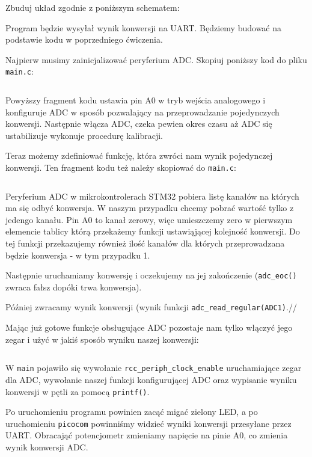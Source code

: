 \documentclass{pdfBooklets}
\begin{document}
Zbuduj układ zgodnie z poniższym schematem:

Program będzie wysyłał wynik konwersji na UART. Będziemy budować na podstawie kodu w poprzedniego ćwiczenia.

Najpierw musimy zainicjalizować peryferium ADC. Skopiuj poniższy kod do pliku \Verb$main.c$:

\inputminted[frame=single,firstline=13,lastline=35]{c}{stm32-examples/03_adc/main.c} %

Powyższy fragment kodu ustawia pin A0 w tryb wejścia analogowego i konfiguruje ADC w sposób pozwalający na przeprowadzanie pojedynczych konwersji. Następnie włącza ADC, czeka pewien okres czasu aż ADC się ustabilizuje wykonuje procedurę kalibracji.

Teraz możemy zdefiniować funkcję, która zwróci nam wynik pojedynczej konwersji.
Ten fragment kodu też należy skopiować do \Verb$main.c$:

\inputminted[frame=single,firstline=36,lastline=48]{c}{stm32-examples/03_adc/main.c} %

Peryferium ADC w mikrokontrolerach STM32 pobiera listę kanałów na których ma się odbyć konwersja. W naszym przypadku chcemy pobrać
wartość tylko z jedengo kanału. Pin A0 to kanał zerowy, więc umieszczemy zero w pierwszym elemencie tablicy którą przekażemy
funkcji ustawiąjącej kolejność konwersji. Do tej funkcji przekazujemy również ilość kanałów dla których przeprowadzana będzie
konwersja - w tym przypadku 1.

Następnie uruchamiamy konwersję i oczekujemy na jej zakończenie (\Verb$adc_eoc()$ zwraca fałsz dopóki trwa konwersja).

Później zwracamy wynik konwersji (wynik funkcji \Verb$adc_read_regular(ADC1)$.//

Mając już gotowe funkcje obsługujące ADC pozostaje nam tylko włączyć jego zegar i użyć w jakiś sposób wyniku naszej konwersji:

\inputminted[frame=single,firstline=49]{c}{stm32-examples/03_adc/main.c} %

W \Verb$main$ pojawiło się wywołanie \Verb$rcc_periph_clock_enable$ uruchamiające zegar dla ADC, wywołanie naszej funkcji
konfigurującej ADC oraz wypisanie wyniku konwersji w pętli za pomocą \Verb$printf()$.

Po uruchomieniu programu powinien zacąć migać zielony LED, a po uruchomieniu \Verb$picocom$ powinniśmy widzieć wyniki konwersji
przesyłane przez UART. Obracająć potencjometr zmieniamy napięcie na pinie A0, co zmienia wynik konwersji ADC.
\end{document}

